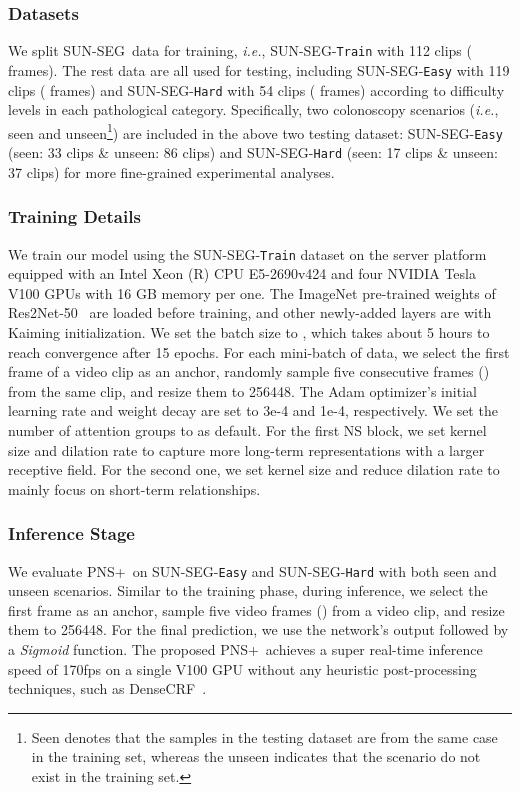 \documentclass[default,iicol]{sn-jnl}
\theoremstyle{thmstyleone}
\theoremstyle{thmstyletwo}
\theoremstyle{thmstylethree}
\def\ie{\emph{i.e.}}
\def\ourmodel{PNS+}
\def\ourdataset{SUN-SEG}
\begin{document}
\subsubsection{Datasets}\label{sec:data_split}
We split  \ourdataset~data for training, \ie, \ourdataset-\texttt{Train} with 112 clips ( frames).
The rest data are all used for testing, including \ourdataset-\texttt{Easy} with 119 clips ( frames) and \ourdataset-\texttt{Hard} with 54 clips ( frames) according to difficulty levels in each pathological category.
Specifically, two colonoscopy scenarios (\ie, seen and unseen\footnote{Seen denotes that the samples in the testing dataset are from the same case in the training set, whereas the unseen indicates that the scenario do not exist in the training set.}) are included in the above two testing dataset: \ourdataset-\texttt{Easy} (seen: 33 clips \& unseen: 86 clips) and \ourdataset-\texttt{Hard} (seen: 17 clips \& unseen: 37 clips) for more fine-grained experimental analyses.

\subsubsection{Training Details}\label{sec:training_settings}
We train our model using the \ourdataset-\texttt{Train} dataset on the server platform equipped with an Intel Xeon (R) CPU E5-2690v424 and four NVIDIA Tesla V100 GPUs with 16 GB memory per one.
The ImageNet pre-trained weights of Res2Net-50~\cite{pami20Res2net} are loaded before training, and other newly-added layers are with Kaiming initialization.
We set the batch size to , which takes about 5 hours to reach convergence after 15 epochs.
For each mini-batch of data, we select the first frame of a video clip as an anchor, randomly sample five consecutive frames () from the same clip, and resize them to 256448.
The Adam optimizer's initial learning rate and weight decay are set to 3e-4 and 1e-4, respectively.
We set the number of attention groups to  as default.
For the first NS block, we set kernel size  and dilation rate  to capture more long-term representations with a larger receptive field.
For the second one, we set kernel size  and reduce dilation rate  to mainly focus on short-term relationships.

\subsubsection{Inference Stage}
We evaluate \ourmodel~on \ourdataset-\texttt{Easy} and \ourdataset-\texttt{Hard} with both seen and unseen scenarios.
Similar to the training phase, during inference, we select the first frame as an anchor, sample five video frames () from a video clip, and resize them to 256448.
For the final prediction, we use the network's output  followed by a \textit{Sigmoid} function.
The proposed \ourmodel~achieves a super real-time inference speed of 170fps on a single V100 GPU without any heuristic post-processing techniques, such as DenseCRF~\cite{krahenbuhl2011efficient}.
\end{document}
